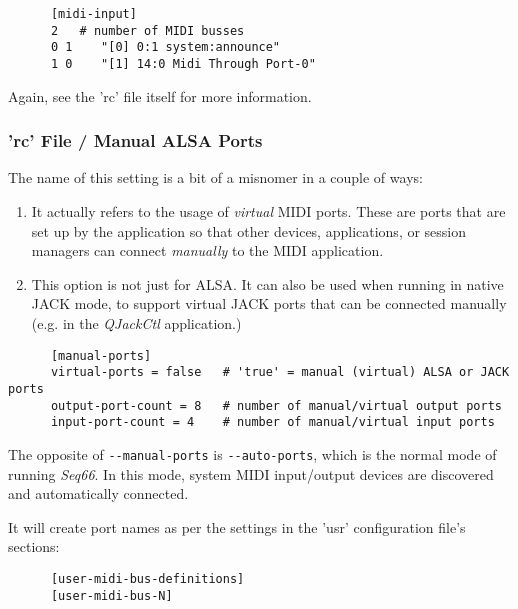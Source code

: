    \begin{verbatim}
      [midi-input]
      2   # number of MIDI busses
      0 1    "[0] 0:1 system:announce"
      1 0    "[1] 14:0 Midi Through Port-0"
   \end{verbatim}

   Again, see the 'rc' file itself for more information.

\subsubsection{'rc' File / Manual ALSA Ports}
\label{subsubsec:configuration_rc_manual_ports}

   The name of this setting is a bit of a misnomer in a couple of ways:

   \begin{enumerate}
      \item It actually refers to the usage of \textsl{virtual} MIDI ports.
         These are ports that are set up by the application so that other
         devices, applications, or session managers can connect
         \textsl{manually} to the MIDI application.
      \item This option is not just for ALSA.  It can also be used when
         running in native JACK mode, to support
         virtual JACK ports that can be connected manually (e.g. in the
         \textsl{QJackCtl} application.)
   \end{enumerate}

   \begin{verbatim}
      [manual-ports]
      virtual-ports = false   # 'true' = manual (virtual) ALSA or JACK ports
      output-port-count = 8   # number of manual/virtual output ports
      input-port-count = 4    # number of manual/virtual input ports
   \end{verbatim}

   The opposite of \texttt{-{}-manual-ports} is \texttt{-{}-auto-ports},
   which is the normal mode of running \textsl{Seq66}.
   In this mode, system MIDI input/output devices are discovered and
   automatically connected.

   It will create port names as per the settings in the 'usr' configuration
   file's sections:

   \begin{verbatim}
      [user-midi-bus-definitions]
      [user-midi-bus-N]
   \end{verbatim}

